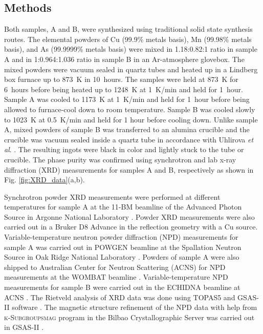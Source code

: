 \documentclass[letterpaper,10pt,doublespacing,edeposit]{uiucthesis2020}
\begin{document}
\begin{mainmatter}


\section{Methods}

Both samples, A and B, were synthesized using traditional solid state synthesis routes. The elemental powders of Cu (99.9\% metals basis), Mn (99.98\% metals basis), and As (99.9999\% metals basis) were mixed in 1.18:0.82:1 ratio in sample A and in 1:0.964:1.036 ratio in sample B in an Ar-atmosphere glovebox.  %
The mixed powders were vacuum sealed in quartz tubes and heated up in a Lindberg box furnace up to 873~K in 10~hours. The samples were held at 873~K for 6~hours before being heated up to 1248~K at 1~K/min and held for 1~hour. Sample A was cooled to 1173~K at 1~K/min and held for 1~hour before being allowed to furnace-cool down to room temperature. Sample B was cooled slowly to 1023~K at 0.5~K/min and held for 1 hour before cooling down. Unlike sample A, mixed powders of sample B was transferred to an alumina crucible and the crucible was vacuum sealed inside a quartz tube in accordance with Uhlirova \textit{et al}. \cite{Uhlirova2019}. The resulting ingots were black in color and lightly stuck to the tube or crucible. The phase purity was confirmed using synchrotron and lab x-ray diffraction (XRD) measurements for samples A and B, respectively as shown in Fig. \ref{fig:XRD_data}(a,b).

Synchrotron powder XRD measurements were performed at different temperatures for sample A at the 11-BM beamline of the Advanced Photon Source in Argonne National Laboratory \cite{wang_dedicated_2008}. Powder XRD measurements were also carried out in a Bruker D8 Advance in the reflection geometry with a Cu source. Variable-temperature neutron powder diffraction (NPD) measurements for sample A was carried out in POWGEN beamline at the Spallation Neutron Source in Oak Ridge National Laboratory \cite{Huq:in5025,mason2006spallation}. Powders of sample A were also shipped to Australian Center for Neutron Scattering (ACNS) for NPD measurements at the WOMBAT beamline \cite{STUDER20061013}. Variable-temperature NPD measurements for sample B were carried out in the ECHIDNA beamline at ACNS \cite{Avdeev2018}. The Rietveld analysis of XRD data was done using \textsc{TOPAS5} and \textsc{GSAS-II} software \cite{Coelho:jo5037,Toby:aj5212}. The magnetic structure refinement of the NPD data with help from \textsc{k-Subgroupsmag} program \cite{Perez-Mato2015} in the Bilbao Crystallographic Server was carried out in \textsc{GSAS-II} \cite{Toby:aj5212}.



\end{mainmatter}
\end{document}
